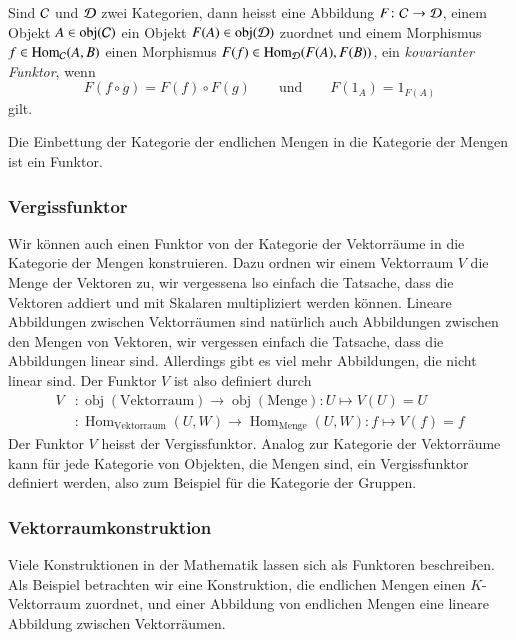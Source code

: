 \begin{definition}
Sind $\cal C$ und $\cal D$ zwei Kategorien, dann heisst eine Abbildung
$F\colon\cal C\to \cal D$, einem Objekt $A\in \operatorname{obj}(\cal C)$
ein Objekt $F(A)\in\operatorname{obj}(\cal D)$ zuordnet und einem
Morphismus $f\in\operatorname{Hom}_{\cal C}(A,B)$ einen Morphismus
$F(f)\in\operatorname{Hom}_{\cal D}(F(A),F(B))$, ein {\em kovarianter Funktor},
wenn
\[
F(f\circ g)=F(f)\circ F(g)
\qquad\text{und}\qquad
F(1_A)=1_{F(A)}
\]
gilt.
\end{definition}

Die Einbettung der Kategorie der endlichen Mengen in die Kategorie der
Mengen ist ein Funktor.

\subsubsection{Vergissfunktor}
Wir können auch einen Funktor von der Kategorie der Vektorräume in die
Kategorie der Mengen konstruieren.
Dazu ordnen wir einem Vektorraum $V$ die Menge der Vektoren zu, 
wir vergessena lso einfach die Tatsache, dass die Vektoren addiert und
mit Skalaren multipliziert werden können.
Lineare Abbildungen zwischen Vektorräumen sind natürlich auch Abbildungen
zwischen den Mengen von Vektoren, wir vergessen einfach die Tatsache,
dass die Abbildungen linear sind.
Allerdings gibt es viel mehr Abbildungen, die nicht linear sind.
Der Funktor $V$ ist also definiert durch
\begin{align*}
V
&\colon
\operatorname{obj}(\text{Vektorraum})
\to
\operatorname{obj}(\text{Menge})
:
U\mapsto V(U)=U\\
&\colon
\operatorname{Hom}_{\text{Vektorraum}}(U,W)
\to
\operatorname{Hom}_{\text{Menge}}(U,W)
:
f\mapsto V(f)=f
\end{align*}
Der Funktor $V$ heisst der Vergissfunktor.
Analog zur Kategorie der Vektorräume kann für jede Kategorie von Objekten,
die Mengen sind, ein Vergissfunktor definiert werden, also zum Beispiel
für die Kategorie der Gruppen.

\subsubsection{Vektorraumkonstruktion}
Viele Konstruktionen in der Mathematik lassen sich als Funktoren
beschreiben.
Als Beispiel betrachten wir eine Konstruktion, die endlichen Mengen
einen $K$-Vektorraum zuordnet, und einer Abbildung von endlichen Mengen
eine lineare Abbildung zwischen Vektorräumen.

